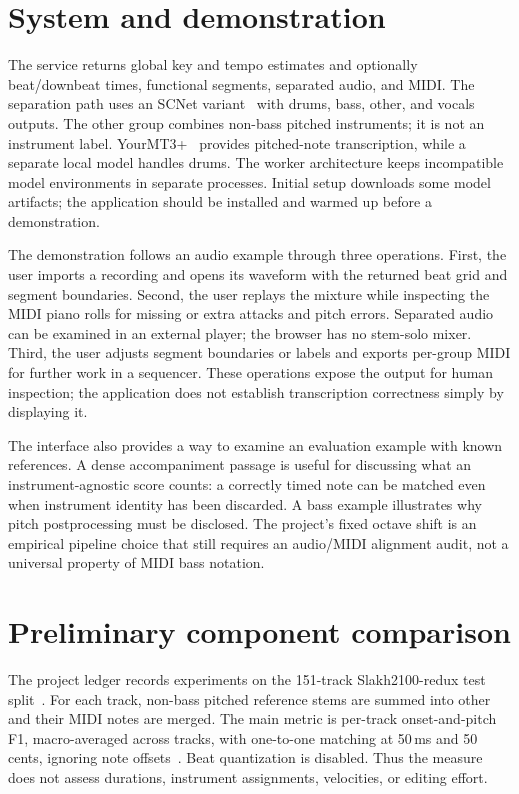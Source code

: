 \documentclass{article}
\begin{document}
\section{System and demonstration}
The service returns global key and tempo estimates and optionally beat/downbeat
times, functional segments, separated audio, and MIDI. The separation path uses
an SCNet variant~\cite{tong2024scnet} with drums, bass, other, and vocals outputs.
The other group combines non-bass pitched instruments; it is not an instrument
label. YourMT3+~\cite{chang2024yourmt3} provides pitched-note transcription, while
a separate local model handles drums. The worker architecture keeps incompatible
model environments in separate processes. Initial setup downloads some model
artifacts; the application should be installed and warmed up before a demonstration.

The demonstration follows an audio example through three operations. First, the
user imports a recording and opens its waveform with the returned beat grid and
segment boundaries. Second, the user replays the mixture while inspecting the MIDI
piano rolls for missing or extra attacks and pitch errors. Separated audio can
be examined in an external player; the browser has no stem-solo mixer. Third, the user adjusts segment boundaries or labels and exports
per-group MIDI for further work in a sequencer. These operations expose the output
for human inspection; the application does not establish transcription correctness
simply by displaying it.

The interface also provides a way to examine an evaluation example with known
references. A dense accompaniment passage is useful for discussing what an
instrument-agnostic score counts: a correctly timed note can be matched even when
instrument identity has been discarded. A bass example illustrates why pitch
postprocessing must be disclosed. The project's fixed octave shift is an empirical
pipeline choice that still requires an audio/MIDI alignment audit, not a universal
property of MIDI bass notation.

\section{Preliminary component comparison}
The project ledger records experiments on the 151-track Slakh2100-redux test
split~\cite{manilow2019slakh}. For each track, non-bass pitched reference stems are
summed into other and their MIDI notes are merged. The main metric is per-track
onset-and-pitch F1, macro-averaged across tracks, with one-to-one matching at 50\,ms
and 50 cents, ignoring note offsets~\cite{raffel2014mireval}. Beat quantization is
disabled. Thus the measure does not assess durations, instrument assignments,
velocities, or editing effort.
\end{document}
